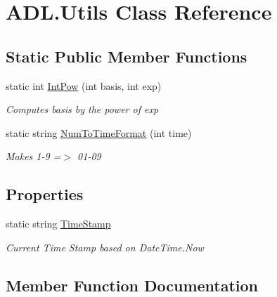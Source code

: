 \hypertarget{class_a_d_l_1_1_utils}{}\section{A\+D\+L.\+Utils Class Reference}
\label{class_a_d_l_1_1_utils}
\subsection*{Static Public Member Functions}
\begin{DoxyCompactItemize}
\item 
static int \mbox{\hyperlink{class_a_d_l_1_1_utils_ac921cfeea8d73d9ac4298802e2594504}{Int\+Pow}} (int basis, int exp)
\begin{DoxyCompactList}\small\item\em Computes basis by the power of exp \end{DoxyCompactList}\item 
static string \mbox{\hyperlink{class_a_d_l_1_1_utils_a7f8a756ce7c6c8d4cfe7126ef534e151}{Num\+To\+Time\+Format}} (int time)
\begin{DoxyCompactList}\small\item\em Makes 1-\/9 =$>$ 01-\/09 \end{DoxyCompactList}\end{DoxyCompactItemize}
\subsection*{Properties}
\begin{DoxyCompactItemize}
\item 
static string \mbox{\hyperlink{class_a_d_l_1_1_utils_a93a1013d16031cf968a4383b56f4b24f}{Time\+Stamp}}
\begin{DoxyCompactList}\small\item\em Current Time Stamp based on Date\+Time.\+Now \end{DoxyCompactList}\end{DoxyCompactItemize}


\subsection{Member Function Documentation}
\mbox{\label{class_a_d_l_1_1_utils_ac921cfeea8d73d9ac4298802e2594504}} 
